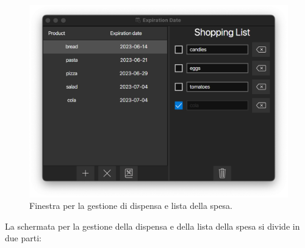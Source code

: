 \documentclass{article}
\begin{document}
\begin{figure}[H]
    \includegraphics[width=\linewidth]{images/main-view.png}
    \caption{Finestra per la gestione di dispensa e lista della spesa.}
    \label{fig:mainview}
\end{figure}

La schermata per la gestione della dispensa e della lista della spesa si divide in due parti:
\end{document}
